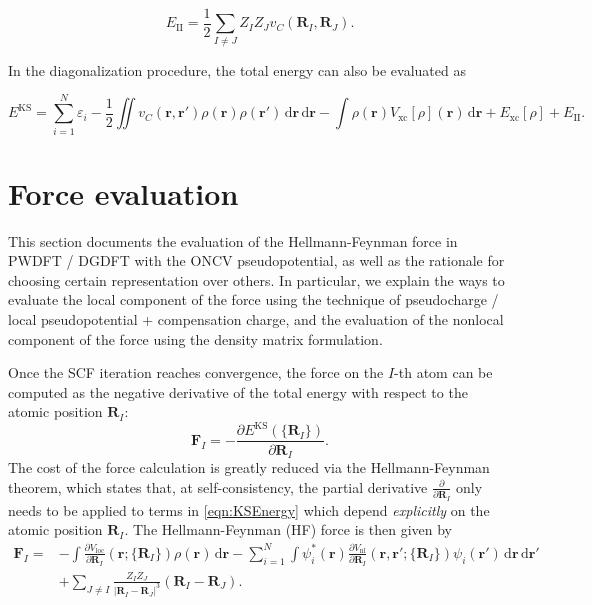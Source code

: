 \documentclass{article}
\newcommand{\bvec}[1]{\mathbf{#1}}
\newcommand{\vr}{\bvec{r}}
\newcommand{\vF}{\bvec{F}}
\newcommand{\vR}{\bvec{R}}
\newcommand{\abs}[1]{\left\lvert#1\right\rvert}
\newcommand{\ud}{\,\mathrm{d}}
\newcommand{\II}{\mathrm{II}}
\newcommand{\xc}{\mathrm{xc}}
\theoremstyle{plain}
\theoremstyle{remark}
\theoremstyle{plain}
\theoremstyle{plain}
\theoremstyle{plain}
\begin{document}
\begin{equation}
E_{\II}=\frac12 \sum_{I\ne J} Z_I Z_J v_C(\vR_I,\vR_J).
\label{eqn:ionionenergy}
\end{equation}

In the diagonalization procedure, the total energy can also be evaluated as

\begin{equation}
  E^{\text{KS}}=\sum_{i=1}^N \varepsilon_i - \frac{1}{2} \iint v_C(\vr,\vr')\rho(\vr) \rho(\vr') \ud \vr \ud \vr-\int
    \rho(\vr)V_{\xc}[\rho](\vr) \ud \vr+E_{\xc}[\rho] + E_{\II}.
  \label{eqn:KSEnergy2}
\end{equation}

 
\section{Force evaluation}\label{sec:force}

This section documents the evaluation of the Hellmann-Feynman force in PWDFT / DGDFT with the ONCV pseudopotential, as well as the rationale for choosing certain representation over others. In particular, we explain the ways to evaluate the local component of the force using the technique of pseudocharge / local pseudopotential + compensation charge, and the evaluation of the nonlocal component of the force using the density matrix formulation.

Once the SCF iteration
reaches convergence, the force on the $I$-th atom can be
computed as the negative derivative of the total energy with respect to
the atomic position $\vR_{I}$:
\begin{equation}
  \vF_{I} = -\frac{\partial E^{\text{KS}}(\{\vR_{I}\})}{\partial
  \vR_{I}}.
  \label{eqn:forceDef}
\end{equation}
The cost of the force calculation is
greatly reduced via the Hellmann-Feynman theorem,
which states that, at self-consistency,
the partial derivative $\frac{\partial}{\partial \vR_{I}}$ only needs to be applied to
terms in \cref{eqn:KSEnergy} which depend \textit{explicitly} on the
atomic position $\vR_{I}$. The Hellmann-Feynman (HF) force is then given by
\begin{equation}
  \begin{split}
    \vF_{I} = &-\int \frac{\partial
    V_{\text{loc}}}{\partial \vR_{I}}(\vr;\{\vR_{I}\}) \rho(\vr) \ud \vr
    - \sum_{i=1}^{N} \int \psi_{i}^{*}(\vr)
    \frac{\partial V_{\text{nl}}}{\partial \vR_{I}}(\vr,\vr';\{\vR_{I}\})
    \psi_{i}(\vr') \ud \vr \ud \vr'\\
    &+ \sum_{J\ne I}\frac{Z_{I}Z_{J}}{\abs{\vR_{I}-\vR_{J}}^3}(\vR_{I}-\vR_{J}).
  \end{split}
  \label{eqn:forceHF1}
\end{equation}
\end{document}
